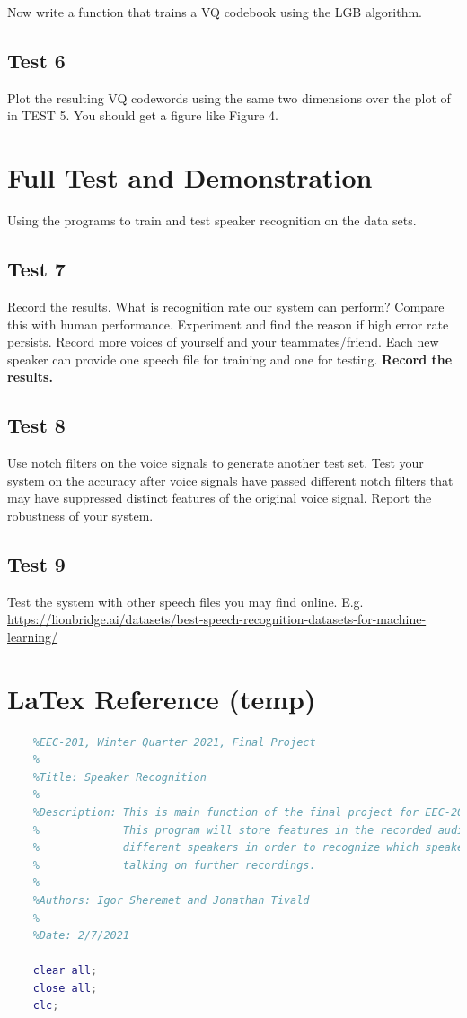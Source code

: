 \documentclass{article}
\begin{document}
Now write a function that trains a VQ codebook using the LGB algorithm.

\subsection{Test 6}
Plot the resulting VQ codewords using the same two dimensions over the plot of in TEST 5. You
should get a figure like Figure 4.

\section{Full Test and Demonstration}
Using the programs to train and test speaker recognition on the data sets.

\subsection{Test 7}
Record the results. What is recognition rate our system can perform? Compare this with human
performance. Experiment and find the reason if high error rate persists. Record more voices of yourself
and your teammates/friend. Each new speaker can provide one speech file for training and one for testing.
\textbf{Record the results.}

\subsection{Test 8}
Use notch filters on the voice signals to generate another test set. Test your system on the
accuracy after voice signals have passed different notch filters that may have suppressed distinct features of
the original voice signal. Report the robustness of your system.

\subsection{Test 9}
Test the system with other speech files you may find online. E.g.
\url{https://lionbridge.ai/datasets/best-speech-recognition-datasets-for-machine-learning/}

\section{LaTex Reference (temp)}

\begin{lstlisting}[language=Matlab]
    %
    %EEC-201, Winter Quarter 2021, Final Project
    %
    %Title: Speaker Recognition
    %
    %Description: This is main function of the final project for EEC-201.
    %             This program will store features in the recorded audio of 
    %             different speakers in order to recognize which speaker is
    %             talking on further recordings.
    %
    %Authors: Igor Sheremet and Jonathan Tivald
    %
    %Date: 2/7/2021
    
    clear all;
    close all;
    clc;
\end{lstlisting}
\end{document}
